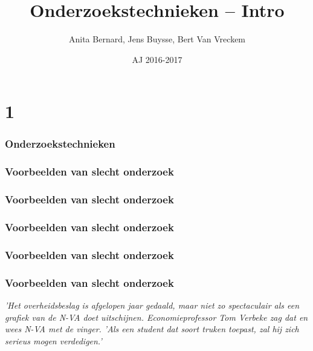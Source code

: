 \documentclass{beamer}
\title[Intro]{Onderzoekstechnieken -- Intro}
\author{Anita Bernard, Jens Buysse, Bert {Van Vreckem}}
\date{AJ 2016-2017}
\begin{document}

\HoGentLogo

\titleframe


\section{1}


\begin{frame}
  \frametitle{Onderzoekstechnieken}

\end{frame}

\begin{frame}
  \frametitle{Voorbeelden van slecht onderzoek}

\end{frame}

\begin{frame}
  \frametitle{Voorbeelden van slecht onderzoek}

\end{frame}

\begin{frame}
  \frametitle{Voorbeelden van slecht onderzoek}

\end{frame}

\begin{frame}
  \frametitle{Voorbeelden van slecht onderzoek}

\end{frame}

\begin{frame}
	\frametitle{Voorbeelden van slecht onderzoek}
	{\tiny \textit{'Het overheidsbeslag is afgelopen jaar gedaald, maar niet zo spectaculair als een grafiek van de N-VA doet uitschijnen. Economieprofessor Tom Verbeke zag dat en wees N-VA met de vinger. 'Als een student dat soort truken toepast, zal hij zich serieus mogen verdedigen.'} }
\end{frame}
\end{document}
